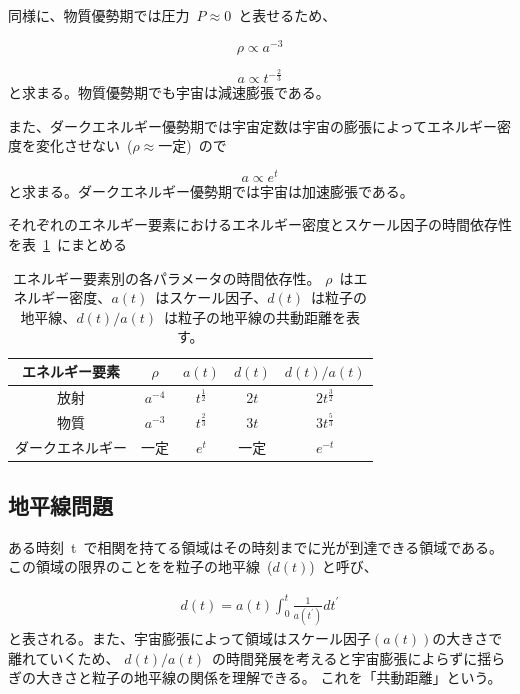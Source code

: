 同様に、物質優勢期では圧力~$P \approx0$~と表せるため、

\begin{equation}
  \rho \propto a^{-3}
  \label{matter_rho}
\end{equation}

\begin{equation}
  a \propto t^{-\frac{2}{3}}
  \label{matter_t}
\end{equation}
と求まる。物質優勢期でも宇宙は減速膨張である。

また、ダークエネルギー優勢期では宇宙定数は宇宙の膨張によってエネルギー密度を変化させない~($\rho \approx $一定)~ので

\begin{equation}
  a \propto e^t
  \label{lambda_t}
\end{equation}
と求まる。ダークエネルギー優勢期では宇宙は加速膨張である。

それぞれのエネルギー要素におけるエネルギー密度とスケール因子の時間依存性を表~\ref{energy_table}~にまとめる

\begin{table}[htbp]
  \centering
  \caption{エネルギー要素別の各パラメータの時間依存性。
  $\rho$~はエネルギー密度、$a(t)$~はスケール因子、$d(t)$~は粒子の地平線、$d(t)/a(t)$~は粒子の地平線の共動距離を表す。}
  \vspace{3mm}
  \begin{tabular}{ccccc} \hline
    エネルギー要素 & $\rho$ & $a(t)$ & $d(t)$ & $d(t)/a(t)$ \\ \hline
    放射 & $a^{-4}$ & $t^{\frac{1}{2}}$ & 2$t$ & $2t^{\frac{3}{2}}$\\
    物質 & $a^{-3}$ & $t^{\frac{2}{3}}$ & 3$t$ & $3t^{\frac{5}{3}}$\\
    ダークエネルギー & 一定 & $e^t$ & 一定 & $e^{-t}$\\ \hline
  \end{tabular}
  \label{energy_table}
\end{table}




\subsection{地平線問題}

ある時刻~t~で相関を持てる領域はその時刻までに光が到達できる領域である。
この領域の限界のことをを粒子の地平線~($d(t)$)~と呼び、

\begin{eqnarray}
  d(t) = a(t)\int_{0}^{t} \frac{1}{a(t^{\prime})}dt^{\prime}
\end{eqnarray}
と表される。また、宇宙膨張によって領域はスケール因子$(a(t))$の大きさで離れていくため、
$d(t)/a(t)$~の時間発展を考えると宇宙膨張によらずに揺らぎの大きさと粒子の地平線の関係を理解できる。
これを「共動距離」という。

